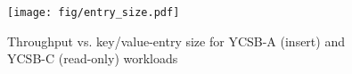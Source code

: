 
\begin{figure}
\centering
      \texttt{[image: fig/entry\_size.pdf]}
\caption{Throughput vs. key/value-entry size for YCSB-A (insert) and YCSB-C (read-only) workloads}
             \label{fig:microbenchmarks-d}
\end{figure}





